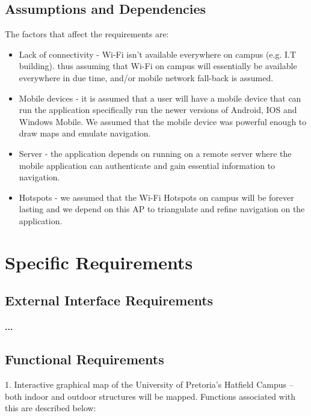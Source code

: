 \documentclass[runningheads,a4paper]{llncs}
\begin{document}
\subsection{Assumptions and Dependencies}
\let\labelitemi\labelitemii
The factors that affect the requirements are:
\begin{itemize}
	 
		\item Lack of connectivity -  Wi-Fi isn't available everywhere on campus (e.g. I.T building). thus assuming that Wi-Fi on campus will essentially be available everywhere in due time, and/or mobile network fall-back is assumed. \\
		
		\item Mobile devices - it is assumed that a user will have a mobile device that can run the application specifically run the newer versions of Android, IOS and Windows Mobile. We assumed that the mobile device was powerful enough to draw maps and emulate navigation.
		
		\item Server - the application depends on running on a remote server where the mobile application can authenticate and gain essential information to navigation.
		
		\item Hotspots - we assumed that the Wi-Fi Hotspots on campus will be forever lasting and we depend on this AP to triangulate and refine navigation on the application.
	 
\end{itemize}


\section{Specific Requirements}

\subsection{External Interface Requirements}
\paragraph{...}
\subsection{Functional Requirements}

\let\labelitemi\labelitemii
1. Interactive graphical map of the University of Pretoria's Hatfield Campus – both indoor and outdoor structures will be mapped. Functions associated with this are described below:
\end{document}
